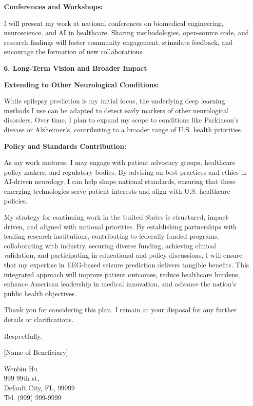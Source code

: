 \documentclass{article}
\begin{document}
{\bf Conferences and Workshops: }

I will present my work at national conferences on biomedical engineering, neuroscience, and AI in healthcare. Sharing methodologies, open-source code, and research findings will foster community engagement, stimulate feedback, and encourage the formation of new collaborations.

{\bf 6. Long-Term Vision and Broader Impact } 

{\bf Extending to Other Neurological Conditions: }

While epilepsy prediction is my initial focus, the underlying deep learning methods I use can be adapted to detect early markers of other neurological disorders. Over time, I plan to expand my scope to conditions like Parkinson’s disease or Alzheimer’s, contributing to a broader range of U.S. health priorities.

{\bf Policy and Standards Contribution: }

As my work matures, I may engage with patient advocacy groups, healthcare policy makers, and regulatory bodies. By advising on best practices and ethics in AI-driven neurology, I can help shape national standards, ensuring that these emerging technologies serve patient interests and align with U.S. healthcare policies.

My strategy for continuing work in the United States is structured, impact-driven, and aligned with national priorities. By establishing partnerships with leading research institutions, contributing to federally funded programs, collaborating with industry, securing diverse funding, achieving clinical validation, and participating in educational and policy discussions, I will ensure that my expertise in EEG-based seizure prediction delivers tangible benefits. This integrated approach will improve patient outcomes, reduce healthcare burdens, enhance American leadership in medical innovation, and advance the nation’s public health objectives.

Thank you for considering this plan. I remain at your disposal for any further details or clarifications.

Respectfully,

[Name of Beneficiary]

\vspace{5\baselineskip}

Wenbin Hu\\
999 99th st,\\
Default City, FL, 99999\\
Tel. (999) 999-9999
\end{document}
